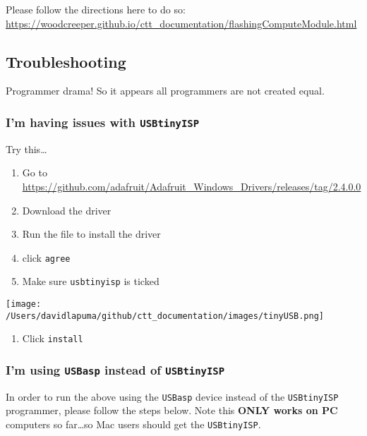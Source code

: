\documentclass[
]{article}
\providecommand{\tightlist}{%
  \setlength{\itemsep}{0pt}\setlength{\parskip}{0pt}}
\begin{document}
Please follow the directions here to do so:
\url{https://woodcreeper.github.io/ctt_documentation/flashingComputeModule.html}

\hypertarget{troubleshooting}{%
\subsection{Troubleshooting}\label{troubleshooting}}

Programmer drama! So it appears all programmers are not created equal.

\hypertarget{im-having-issues-with-usbtinyisp}{%
\subsubsection{\texorpdfstring{I'm having issues with
\texttt{USBtinyISP}}{I'm having issues with USBtinyISP}}\label{im-having-issues-with-usbtinyisp}}

Try this\ldots{}

\begin{enumerate}
\def\labelenumi{\arabic{enumi}.}
\tightlist
\item
  Go to
  \url{https://github.com/adafruit/Adafruit_Windows_Drivers/releases/tag/2.4.0.0}
\item
  Download the driver
\item
  Run the file to install the driver
\item
  click \texttt{agree}
\item
  Make sure \texttt{usbtinyisp} is ticked
\end{enumerate}

\texttt{[image: /Users/davidlapuma/github/ctt\_documentation/images/tinyUSB.png]}

\begin{enumerate}
\def\labelenumi{\arabic{enumi}.}
\setcounter{enumi}{5}
\tightlist
\item
  Click \texttt{install}
\end{enumerate}

\hypertarget{im-using-usbasp-instead-of-usbtinyisp}{%
\subsubsection{\texorpdfstring{I'm using \texttt{USBasp} instead of
\texttt{USBtinyISP}}{I'm using USBasp instead of USBtinyISP}}\label{im-using-usbasp-instead-of-usbtinyisp}}

In order to run the above using the \texttt{USBasp} device instead of
the \texttt{USBtinyISP} programmer, please follow the steps below. Note
this \textbf{ONLY works on PC} computers so far\ldots so Mac users
should get the \texttt{USBtinyISP}.
\end{document}
